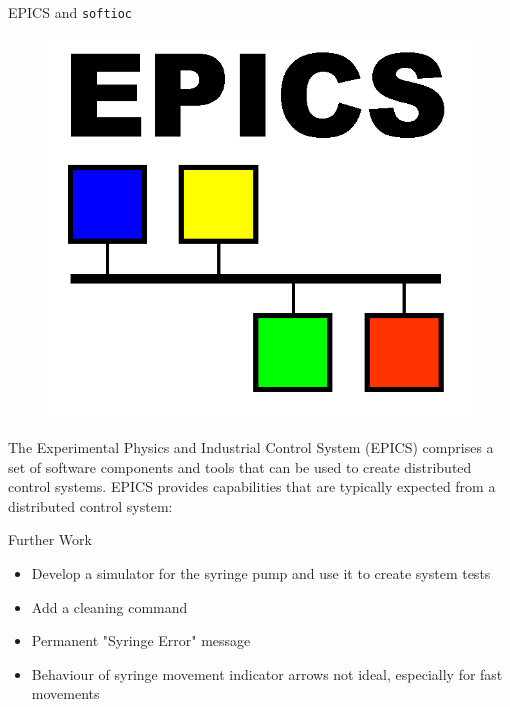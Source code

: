 \documentclass[final,t]{beamer}
\begin{document}
\begin{frame}
\begin{columns}[t]
\begin{column}{.32\linewidth}
      \begin{custombox}{EPICS and \texttt{softioc}}
          \begin{figure}
      \includegraphics[width=\linewidth]{images/epicslogo}
          \end{figure}
      The Experimental Physics and Industrial Control System (EPICS) comprises a set of software components and
      tools that can be used to create distributed control systems. EPICS provides capabilities that are typically expected from a distributed control system:
  \end{custombox}

  \begin{custombox}{Further Work}
    \begin{itemize}
        \item Develop a simulator for the syringe pump and use it to create system tests
        \item Add a cleaning command
        \item Permanent "Syringe Error" message
        \item Behaviour of syringe movement indicator arrows not ideal, especially for fast movements
    \end{itemize}
  \end{custombox}
  \end{column}
  \end{columns}

\end{frame}
\end{document}
